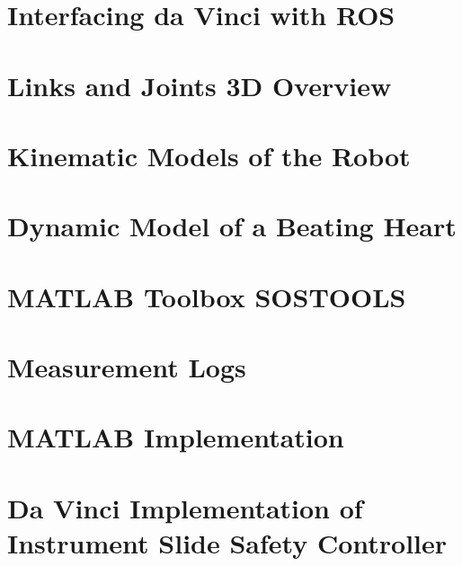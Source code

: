 \begin{appendices}
\appendix
\renewcommand{\appendixname}{Appendix}
\renewcommand{\appendixtocname}{Appendix}

\label{appendixbegin}

\chapter{Interfacing da Vinci with ROS}\label{app:ros}


\chapter{Links and Joints 3D Overview}\label{app:links_joints_3d}


\chapter{Kinematic Models of the Robot}\label{app:kinematic_model_robot}


\chapter{Dynamic Model of a Beating Heart}\label{app:dynamic_model_heart}


\chapter{MATLAB Toolbox SOSTOOLS}\label{app:sostools}


\chapter{Measurement Logs}\label{app:meas}


\chapter{MATLAB Implementation}\label{app:slide_implement_1}


\chapter{Da Vinci Implementation of Instrument Slide Safety Controller}\label{app:slide_implement_2}



\end{appendices}
